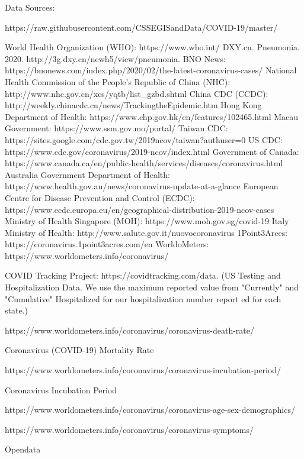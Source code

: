 Data Sources:

https://raw.githubusercontent.com/CSSEGISandData/COVID-19/master/


World Health Organization (WHO): https://www.who.int/
DXY.cn. Pneumonia. 2020. http://3g.dxy.cn/newh5/view/pneumonia.
BNO News: https://bnonews.com/index.php/2020/02/the-latest-coronavirus-cases/
National Health Commission of the People’s Republic of China (NHC):
http://www.nhc.gov.cn/xcs/yqtb/list_gzbd.shtml
China CDC (CCDC): http://weekly.chinacdc.cn/news/TrackingtheEpidemic.htm
Hong Kong Department of Health: https://www.chp.gov.hk/en/features/102465.html
Macau Government: https://www.ssm.gov.mo/portal/
Taiwan CDC: https://sites.google.com/cdc.gov.tw/2019ncov/taiwan?authuser=0
US CDC: https://www.cdc.gov/coronavirus/2019-ncov/index.html
Government of Canada: https://www.canada.ca/en/public-health/services/diseases/coronavirus.html
Australia Government Department of Health: https://www.health.gov.au/news/coronavirus-update-at-a-glance
European Centre for Disease Prevention and Control (ECDC): https://www.ecdc.europa.eu/en/geographical-distribution-2019-ncov-cases
Ministry of Health Singapore (MOH): https://www.moh.gov.sg/covid-19
Italy Ministry of Health: http://www.salute.gov.it/nuovocoronavirus
1Point3Arces: https://coronavirus.1point3acres.com/en
WorldoMeters: https://www.worldometers.info/coronavirus/

COVID Tracking Project: https://covidtracking.com/data. (US Testing and Hospitalization Data. We use the maximum reported value from "Currently" and "Cumulative" Hospitalized for our hospitalization number report ed for each state.)


https://www.worldometers.info/coronavirus/coronavirus-death-rate/

Coronavirus (COVID-19) Mortality Rate

https://www.worldometers.info/coronavirus/coronavirus-incubation-period/

Coronavirus Incubation Period

https://www.worldometers.info/coronavirus/coronavirus-age-sex-demographics/

https://www.worldometers.info/coronavirus/coronavirus-symptoms/

Opendata

